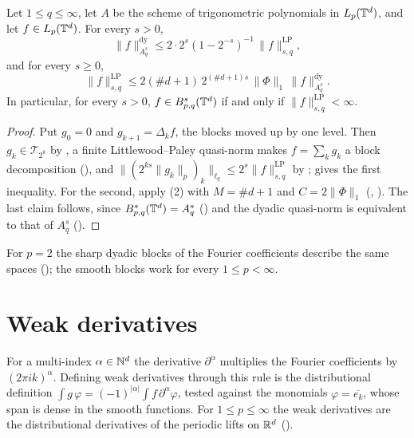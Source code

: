 \begin{theorem}
\label{thm:torus-lp-besov}
\leanok
{}
Let $1 \leq q \leq \infty$, let $A$ be the scheme of trigonometric polynomials in $L_p(\mathbb{T}^d)$,
and let $f \in L_p(\mathbb{T}^d)$. For every $s > 0$,
\[
  \|f\|^{\mathrm{dy}}_{A^s_q} \leq 2 \cdot 2^s (1 - 2^{-s})^{-1} \, \|f\|^{\mathrm{LP}}_{s,q} ,
\]
and for every $s \geq 0$,
\[
  \|f\|^{\mathrm{LP}}_{s,q} \leq 2 (\#d + 1) \, 2^{(\#d + 1) s} \, \|\Phi\|_1 \,
  \|f\|^{\mathrm{dy}}_{A^s_q} .
\]
In particular, for every $s > 0$, $f \in B^{s}_{p,q}(\mathbb{T}^d)$ if and only if
$\|f\|^{\mathrm{LP}}_{s,q} < \infty$.
\end{theorem}

\begin{proof}
\leanok
Put $g_0 = 0$ and $g_{k+1} = \Delta_k f$, the blocks moved up by one level. Then
$g_k \in \mathcal{T}_{2^k}$ by , a finite Littlewood--Paley
quasi-norm makes $f = \sum_k g_k$ a block decomposition (), and
$\|(2^{ks} \|g_k\|_p)_k\|_{\ell_q} \leq 2^s \|f\|^{\mathrm{LP}}_{s,q}$ by
;  gives the first inequality. For the
second, apply (2) with $M = \#d + 1$ and $C = 2\|\Phi\|_1$
(, ). The last claim follows, since
$B^{s}_{p,q}(\mathbb{T}^d) = A^s_q$ () and the dyadic quasi-norm is
equivalent to that of $A^s_q$ ().
\end{proof}

For $p = 2$ the sharp dyadic blocks of the Fourier coefficients describe the same spaces
(); the smooth blocks work for every $1 \leq p < \infty$.

\section{Weak derivatives}
\label{sec:torus-weak-derivatives}

For a multi-index $\alpha \in \mathbb{N}^d$ the derivative $\partial^\alpha$ multiplies the Fourier
coefficients by $(2\pi i k)^\alpha$. Defining weak derivatives through this rule is the
distributional definition $\int g \, \varphi = (-1)^{|\alpha|} \int f \, \partial^\alpha
\varphi$, tested against the monomials $\varphi = \overline{e_k}$, whose span is dense in
the smooth functions. For $1 \leq p \leq \infty$ the weak derivatives are the distributional
derivatives of the periodic lifts on $\mathbb{R}^d$ ().

